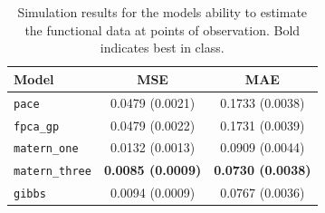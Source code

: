 \begin{table}
	\caption[Simulation results for Scenario C on observed data]{Simulation results for the models ability to estimate the functional data at points of observation. Bold indicates best in class.}
	\centering
	\label{tab:train_C}
	\begin{tabular}{lcc}
		\toprule
		\textbf{Model} & \textbf{MSE} & \textbf{MAE} \\
		\midrule
		\verb*|pace| & 0.0479 (0.0021)& 0.1733	(0.0038)\\
		\verb*|fpca_gp| & 0.0479 (0.0022) & 0.1731	(0.0039) \\
		\verb*|matern_one| & 0.0132	(0.0013) & 0.0909 (0.0044) \\
		\verb*|matern_three| & \textbf{0.0085 (0.0009)} & \textbf{ 0.0730	(0.0038)} \\
		\verb*|gibbs| & 0.0094	(0.0009) & 0.0767 (0.0036)\\
		\bottomrule
	\end{tabular}
\end{table}

